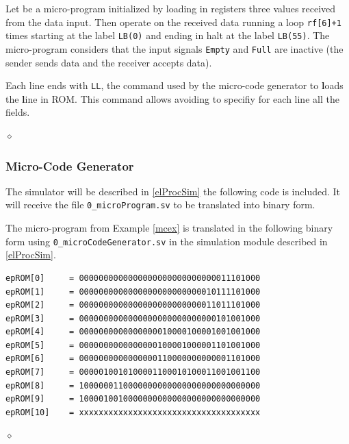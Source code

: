 \begin{exemplu}\label{mcex}
Let be a micro-program initialized by loading in registers three values received from the data input. Then operate on the received data running a loop {\tt rf[6]+1} times starting at the label {\tt LB(0)} and ending in halt at the label {\tt LB(55)}. The micro-program considers that the input signals {\tt Empty} and {\tt Full} are inactive (the sender sends data and the receiver accepts data).
{\em 
{}
}

Each line ends with {\tt LL}, the command used by the micro-code generator to {\bf l}oads the {\bf l}ine in ROM. This command allows avoiding to specifiy for each line all the fields.

$\diamond$
\end{exemplu}


\subsubsection{Micro-Code Generator}

The simulator will be described in \ref{elProcSim} the following code is included. It will receive the file {\tt 0\_microProgram.sv} to be translated into binary form.




\begin{exemplu}
The micro-program from Example \ref{mcex} is translated in the following binary form using {\tt  0\_microCodeGenerator.sv} in the simulation module described in \ref{elProcSim}.

\begin{verbatim}
epROM[0]     = 0000000000000000000000000000011101000
epROM[1]     = 0000000000000000000000000010111101000
epROM[2]     = 0000000000000000000000000011011101000
epROM[3]     = 0000000000000000000000000000101001000
epROM[4]     = 0000000000000000010000100001001001000
epROM[5]     = 0000000000000000100001000001101001000
epROM[6]     = 0000000000000000110000000000001101000
epROM[7]     = 0000010010100001100010100011001001100
epROM[8]     = 1000000110000000000000000000000000000
epROM[9]     = 1000010010000000000000000000000000000
epROM[10]    = xxxxxxxxxxxxxxxxxxxxxxxxxxxxxxxxxxxxx
\end{verbatim}

$\diamond$
\end{exemplu}


